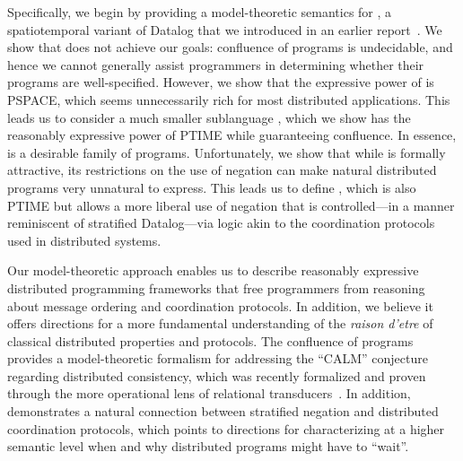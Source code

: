 Specifically, we begin by providing a model-theoretic semantics for \lang, a spatiotemporal variant of Datalog that we introduced in an earlier report~\cite{datalog10}.  We show that \lang does not achieve our goals: confluence of \lang programs is undecidable, and hence we cannot generally assist \lang programmers in determining whether their programs are well-specified.  However, we show that the expressive power of \lang is PSPACE, which seems unnecessarily rich for most distributed applications.  This leads us to consider a much smaller sublanguage \slang, which we show has the reasonably expressive power of PTIME while guaranteeing confluence. In essence, \slang is a desirable family of \lang programs.  Unfortunately, we show that while \slang is formally attractive, its restrictions on the use of negation can make natural distributed programs very unnatural to express.  This leads us to define \plang, which is also PTIME but allows a more liberal use of negation that is controlled---in a manner reminiscent of stratified Datalog---via logic akin to the coordination protocols used in distributed systems.  

Our model-theoretic approach enables us to describe reasonably expressive distributed programming frameworks that free programmers from reasoning about message ordering and coordination protocols.  In addition, we believe it offers directions for a more fundamental understanding of the {\em raison d'etre} of classical distributed properties and protocols.
The confluence of \slang programs provides a model-theoretic formalism for addressing the ``CALM'' conjecture~\cite{calm} regarding distributed consistency, which was recently formalized and proven through the more operational lens of relational transducers~\cite{ameloot11}.  In addition, \plang demonstrates a natural connection between stratified negation and distributed coordination protocols, which points to directions for characterizing at a higher semantic level when and why distributed programs might have to ``wait''.
